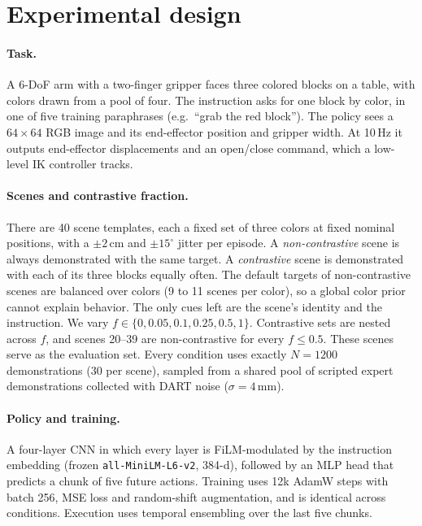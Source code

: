 \documentclass[11pt]{article}
\begin{document}
\section{Experimental design}

\paragraph{Task.}
A 6-DoF arm with a two-finger gripper faces three colored blocks on a table, with colors drawn from
a pool of four. The instruction asks for one block by color, in one of five training paraphrases
(e.g.\ ``grab the red block''). The policy sees a $64{\times}64$ RGB image and its end-effector
position and gripper width. At 10\,Hz it outputs end-effector displacements and an open/close
command, which a low-level IK controller tracks.

\paragraph{Scenes and contrastive fraction.}
There are 40 scene templates, each a fixed set of three colors at fixed nominal positions, with a
$\pm2$\,cm and $\pm15^\circ$ jitter per episode. A \emph{non-contrastive} scene is always
demonstrated with the same target. A \emph{contrastive} scene is demonstrated with each of its three
blocks equally often. The default targets of non-contrastive scenes are balanced over colors (9 to
11 scenes per color), so a global color prior cannot explain behavior. The only cues left are
the scene's identity and the instruction. We vary
$f\in\{0, 0.05, 0.1, 0.25, 0.5, 1\}$. Contrastive sets are nested across $f$, and scenes 20--39 are
non-contrastive for every $f\le 0.5$. These scenes serve as the evaluation set. Every condition
uses exactly $N=1200$ demonstrations (30 per scene), sampled from a shared pool of scripted
expert demonstrations collected with DART noise ($\sigma=4$\,mm).

\paragraph{Policy and training.}
A four-layer CNN in which every layer is FiLM-modulated by the instruction embedding (frozen
\texttt{all-MiniLM-L6-v2}, 384-d), followed by an MLP head that predicts a chunk of five future
actions. Training uses 12k AdamW steps with batch 256, MSE loss and random-shift augmentation, and is
identical across conditions. Execution uses temporal ensembling over the last five chunks.
\end{document}

